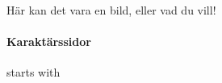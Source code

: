 \documentclass[english]{laspex}
\begin{document}
\begin{framsida}
Här kan det vara en bild, eller vad du vill!
\end{framsida}

\begin{karaktarsida}
\paragraph{Karaktärssidor} starts with
\end{karaktarsida}

\end{document}
